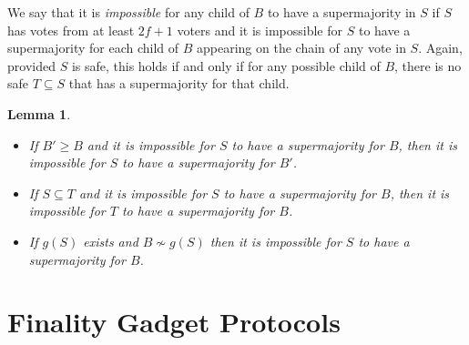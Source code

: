 \documentclass{article}
\newtheorem{lemma}[theorem]{Lemma}
\begin{document}
We say that it is {\em impossible} for any child of $B$ to have a supermajority in $S$ if $S$ has votes from at least $2f+1$ voters and it is impossible for $S$ to have a supermajority for each child of $B$ appearing on the chain of any vote in $S$.
Again, provided $S$ is safe, this holds if and only if for any possible child of $B$, there is no safe $T \subseteq S$ that has a supermajority for that child.
\begin{lemma} \label{lem:impossible}
\begin{itemize}
\item[(i)] If $B' \geq B$ and it is impossible for $S$ to have a supermajority for $B$, then it is impossible for $S$ to have a supermajority for $B'$.
\item[(ii)] If $S \subseteq T$ and it is impossible for $S$ to have a supermajority for $B$, then it is impossible for $T$ to have a supermajority for $B$.
\item[(iii)] If $g(S)$ exists and $B \nsim g(S)$ then it is impossible for $S$ to have a supermajority for $B$.
\end{itemize}
\end{lemma}


\section{Finality Gadget Protocols} \label{sec:finality}
\end{document}
